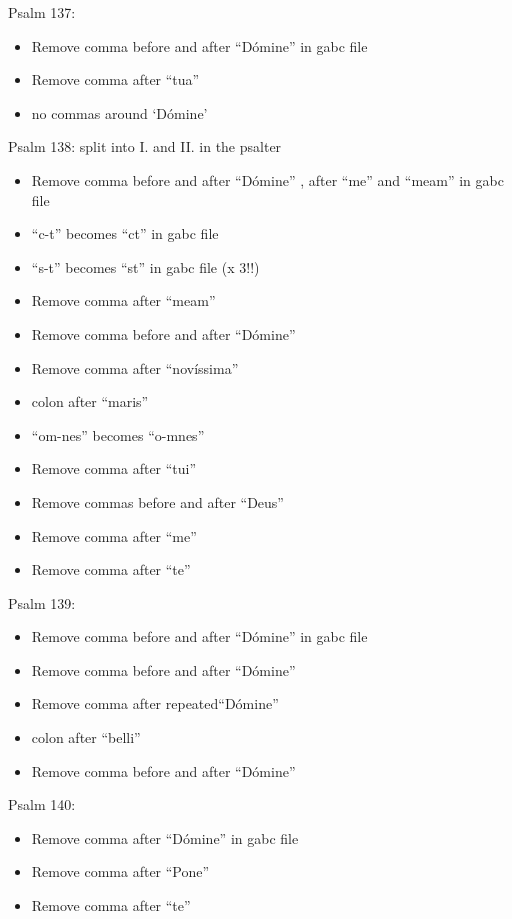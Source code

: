 \documentclass[11pt]{article}
\begin{document}
      Psalm 137:
  \begin{itemize}
  \item Remove comma before and after ``Dómine'' in gabc file
  \item  Remove comma after ``tua''
  \item
  no commas around `Dómine'
    \end{itemize}

      Psalm 138: split into I. and II. in the psalter
  \begin{itemize}
    \item Remove comma before and after ``Dómine'' , after ``me'' and ``meam'' in gabc file
    \item
    ``c-t'' becomes ``ct'' in gabc file
       \item
    ``s-t'' becomes ``st'' in gabc file (x 3!!)
    \item
    Remove comma after ``meam''
  \item Remove comma before and after ``Dómine'' 
  \item  Remove comma after ``novíssima''
  \item
  colon after ``maris''
  \item
   ``om-nes'' becomes  ``o-mnes''
  \item Remove comma after ``tui''
  \item
  
  Remove commas before and after ``Deus''
  \item Remove comma after ``me''
   \item Remove comma after ``te''
  
    \end{itemize}

Psalm 139:
  \begin{itemize}
  \item Remove comma before and after ``Dómine'' in gabc file
  \item  Remove comma before and after ``Dómine'' 
  \item  Remove comma after repeated``Dómine'' 
 \item colon after ``belli''
  \item Remove comma before and after ``Dómine'' 
    \end{itemize}

Psalm 140:
  \begin{itemize}
  \item  Remove comma after ``Dómine'' in gabc file
  \item  Remove comma after ``Pone''
 \item
 Remove comma after ``te''
    \end{itemize}
\end{document}
